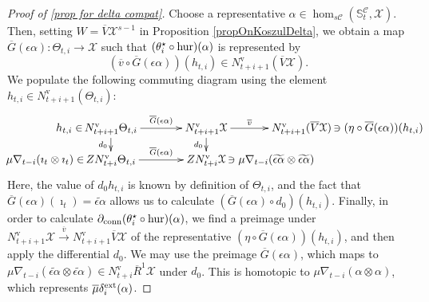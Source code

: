 \documentclass[11pt]{amsart} \renewcommand{\baselinestretch}{1.2}
\theoremstyle{plain}
\theoremstyle{definition}
\renewcommand{\to}{\longrightarrow}
\newcommand{\calx}{\mathcal{X}}
\newcommand{\calc}{\mathcal{C}}
\newcommand{\Nabla}{\nabla}
\newcommand{\uver}{^\mathrm{v}}
\newcommand{\Dendo}{R}
\begin{document}
\begin{Operations on the Bousfield-Kan spectral sequence}
\begin{proof}[Proof of \ref{prop for delta compat}]
Choose a representative $\alpha\in\hom_{s\calc}(\mathbb{S}^\calc_t, \calx )$. Then, setting $W=\overline{V}\calx^{s-1}$ in Proposition \ref{propOnKoszulDelta}, we obtain a map $\overline{G}(\epsilon\alpha):\Theta_{t,i}\to \calx $ such that $(\theta_i^\star\circ\textup{hur})(\alpha)$ is represented by
\[(\overline{v}\circ \overline{G}(\epsilon\alpha))(h_{t,i})
\in N\uver_{t+i+1}(\overline{V}\calx).\]
We populate the following commuting diagram using the element $h_{t,i}\in N\uver_{t+i+1}(\Theta_{t,i})$:
%
\[\xymatrix@R=10mm@C=30mm@!0{
\makebox[0cm][r]{$h_{t,i}\in\,$}N\uver_{t+i+1}\Theta_{t,i}\ar[d]_-{d_0}\ar[r]^-{\overline{G}(\epsilon\alpha)}&%
N\uver_{t+i+1}\calx \ar[d]_-{d_0}
\ar[r]^-{\overline{v}}
&%
N\uver_{t+i+1}(\overline{V}\calx)
\makebox[0cm][l]{$\,\ni (\eta\circ \overline{G}(\epsilon\alpha))(h_{t,i})$}
\\%
\makebox[0cm][r]{$\mu\Nabla_{t-i}(\imath_t\otimes \imath_t)\in\,$}ZN\uver_{t+i}\Theta_{t,i}\ar[r]^-{\overline{G}(\epsilon\alpha)}
&%
ZN\uver_{t+i}\calx \makebox[0cm][l]{$\,\ni\mu\Nabla_{t-i}(\widetilde{\epsilon\alpha}\otimes \widetilde{\epsilon\alpha})$}
&%
}\]
Here, the value of $d_0h_{t,i}$ is known by definition of $\Theta_{t,i}$, 
and the fact that $\overline{G}(\epsilon\alpha)(\imath_t)=\widetilde{\epsilon\alpha}$ allows us to calculate $(\overline{G}(\epsilon\alpha)\circ d_0)(h_{t,i})$. Finally, in order to calculate $\partial_\textup{conn}(\theta_i^\star\circ\textup{hur})(\alpha)$, we find a preimage under $N\uver_{t+i+1}\calx \overset{\overline{v}}{\to}N\uver_{t+i+1}\overline{V}\calx$ of the representative $(\eta\circ \overline{G}(\epsilon\alpha))(h_{t,i})$, and then apply the differential $d_0$. We may use the preimage $\overline{G}(\epsilon\alpha)$, which maps to $\mu\Nabla_{t-i}(\widetilde{\epsilon\alpha}\otimes \widetilde{\epsilon\alpha})\in N\uver_{t+i}\overline{\Dendo}^1\calx $ under $d_0$. This is homotopic to $\mu\Nabla_{t-i}(\alpha\otimes \alpha)$, which represents $\overline{\mu}\delta^\textup{ext}_i(\alpha)$.
\end{proof}

\end{Operations on the Bousfield-Kan spectral sequence}
\end{document}
